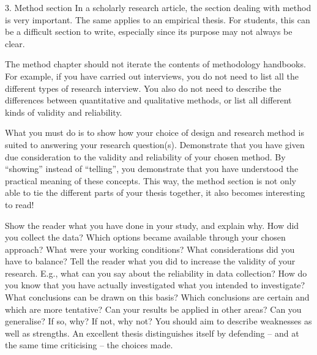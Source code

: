 3. Method section
In a scholarly research article, the section dealing with method is very important. The same applies to an empirical thesis. For students, this can be a difficult section to write, especially since its purpose may not always be clear.

The method chapter should not iterate the contents of methodology handbooks. For example, if you have carried out interviews, you do not need to list all the different types of research interview. You also do not need to describe the differences between quantitative and qualitative methods, or list all different kinds of validity and reliability.

What you must do is to show how your choice of design and research method is suited to answering your research question(s). Demonstrate that you have given due consideration to the validity and reliability of your chosen method. By “showing” instead of “telling”, you demonstrate that you have understood the practical meaning of these concepts. This way, the method section is not only able to tie the different parts of your thesis together, it also becomes interesting to read!

Show the reader what you have done in your study, and explain why. How did you collect the data? Which options became available through your chosen approach?
What were your working conditions? What considerations did you have to balance?
Tell the reader what you did to increase the validity of your research. E.g., what can you say about the reliability in data collection? How do you know that you have actually investigated what you intended to investigate? What conclusions can be drawn on this basis? Which conclusions are certain and which are more tentative? Can your results be applied in other areas? Can you generalise? If so, why? If not, why not?
You should aim to describe weaknesses as well as strengths. An excellent thesis distinguishes itself by defending – and at the same time criticising – the choices made.
